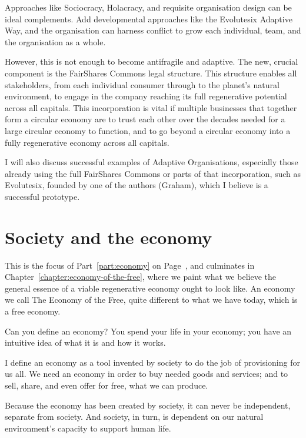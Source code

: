 Approaches like Sociocracy, Holacracy, and requisite organisation design can be ideal complements. Add developmental approaches like the Evolutesix Adaptive Way, and the organisation can harness conflict to grow each individual, team, and the organisation as a whole. 


However, this is not enough to become antifragile and adaptive. The new, crucial component is the FairShares Commons legal structure. This structure enables all stakeholders, from each individual consumer through to the planet's natural environment, to engage in the company reaching its full regenerative potential across all capitals. This incorporation is vital if multiple businesses that together form a circular economy are to trust each other over the decades needed for a large circular economy to function, and to go beyond a circular economy into a fully regenerative economy across all capitals.


I will also discuss successful examples of Adaptive Organisations, especially those already using the full FairShares Commons or parts of that incorporation, such as Evolutesix, founded by one of the authors (Graham), which I believe is a successful prototype.


\section{Society and the economy}
This is the focus of Part~\ref{part:economy} on Page~\pageref{part:economy}, and culminates in Chapter~\ref{chapter:economy-of-the-free}, where we paint what we believe the general essence of a viable regenerative economy ought to look like. An economy we call The Economy of the Free, quite different to what we have today, which is a free economy. 


Can you define an economy? You spend your life in your economy; you have an intuitive idea of what it is and how it works.


I define an economy as a tool invented by society to do the job of provisioning for us all. We need an economy in order to buy needed goods and services; and to sell, share, and even offer for free, what we can produce. 


Because the economy has been created by society, it can never be independent, separate from society. And society, in turn, is dependent on our natural environment's capacity to support human life.  


